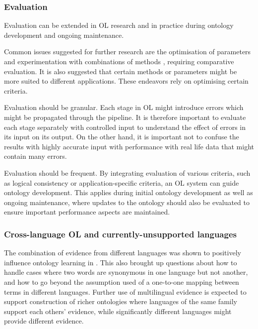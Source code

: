 \documentclass[a4paper]{report}
\begin{document}
\subsubsection{Evaluation}

Evaluation can be extended in OL research and in practice during ontology development and ongoing maintenance.

Common issues suggested for further research are the optimisation of parameters \cite{Hjelm09Thesis} and experimentation with combinations of methods \cite{Cimiano2005Text2Onto,Zouaq11OntoCmaps}, requiring comparative evaluation.
It is also suggested that certain methods or parameters might be more suited to different applications\cite{Gulla08LOUIE, Cimiano06}.
These endeavors rely on optimising certain criteria\cite{Cimiano2009OL}.

Evaluation should be granular.
Each stage in OL might introduce errors which might be propagated through the pipeline\cite{Zouaq11OntoCmaps, Hjelm09Thesis}.
It is therefore important to evaluate each stage separately with controlled input to understand the effect of errors in its input on its output.
On the other hand, it is important not to confuse the results with highly accurate input with performance with real life data that might contain many errors.

Evaluation should be frequent.
By integrating evaluation of various criteria, such as logical consistency or application-specific criteria, an OL system can guide ontology development\cite{Cimiano2009OL}.
This applies during initial ontology development as well as ongoing maintenance, where updates to the ontology should also be evaluated to ensure important performance aspects are maintained\cite{HOO2009OntEngMeth}.

\subsubsection{Cross-language OL and currently-unsupported languages}

The combination of evidence from different languages was shown to positively influence ontology learning in \cite{Hjelm09Thesis}.
This also brought up questions about how to handle cases where two words are synonymous in one language but not another, and how to go beyond the assumption used of a one-to-one mapping between terms in different languages\cite{Hjelm09Thesis}.
Further use of multilingual evidence is expected to support construction of richer ontologies where languages of the same family support each others' evidence, while significantly different languages might provide different evidence\cite{Hjelm09Thesis}.
\end{document}
